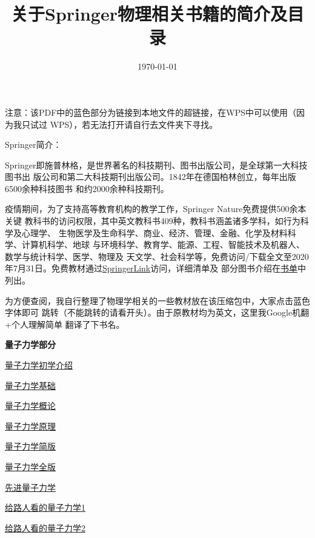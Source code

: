 \documentclass[UTF8]{ctexart}   %
\begin{document}
\title{关于Springer物理相关书籍的简介及目录}
\date{\today}
\maketitle


注意：该PDF中的蓝色部分为链接到本地文件的超链接，在WPS中可以使用（因为我只试过
WPS），若无法打开请自行去文件夹下寻找。

Springer简介：

Springer即施普林格，是世界著名的科技期刊、图书出版公司，是全球第一大科技图书出
版公司和第二大科技期刊出版公司。1842年在德国柏林创立，每年出版6500余种科技图书
和约2000余种科技期刊。

疫情期间，为了支持高等教育机构的教学工作，Springer Nature免费提供500余本关键
教科书的访问权限，其中英文教科书409种，教科书涵盖诸多学科，如行为科学及心理学、
生物医学及生命科学、商业、经济、管理、金融、化学及材料科学、计算机科学、地球
与环境科学、教育学、能源、工程、智能技术及机器人、数学与统计科学、医学、物理及
天文学、社会科学等，免费访问/下载全文至2020年7月31日。免费教材通过\href{https://link.springer.com/}{SpringerLink}访问，详细清单及
部分图书介绍在\href{run:./Physics/Books.xlsx}{书单}中列出。

为方便查阅，我自行整理了物理学相关的一些教材放在该压缩包中，大家点击蓝色字体即可
跳转（不能跳转的请看开头）。由于原教材均为英文，这里我Google机翻+个人理解简单
翻译了下书名。

\clearpage

\centerline{\songti \Large \textbf{量子力学部分}}

\href{run:./Physics/A First Introduction to Quantum Physics.pdf\ }{量子力学初学介绍}

\href{run:./Physics/Foundations of Quantum Mechanics_.pdf\ }{量子力学基础}

\href{run:./Physics/Introductory Quantum Mechanics.pdf\ }{量子力学概论}

\href{run:./Physics/Principles of Quantum Mechanics.pdf\ }{量子力学原理}

\href{run:./Physics/Quantum Mechanics Short Version.pdf\ }{量子力学简版}

\href{run:./Physics/Quantum Mechanics Full Version.pdf\ }{量子力学全版}

\href{run:./Physics/Advanced Quantum Mechanics.pdf\ }{先进量子力学}

\href{run:./Physics/Quantum Mechanics for Pedestrians 1.pdf\ }{给路人看的量子力学1}

\href{run:./Physics/Quantum Mechanics for Pedestrians 2.pdf\ }{给路人看的量子力学2}
\end{document}

